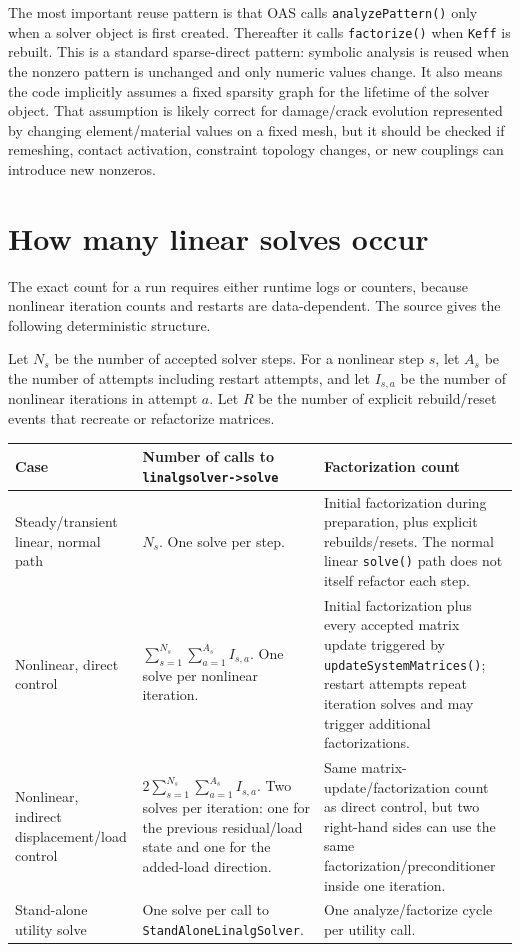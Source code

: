 \documentclass[10pt,a4paper]{article}
\newcommand{\code}[1]{\texttt{#1}}
\begin{document}
The most important reuse pattern is that OAS calls \code{analyzePattern()} only when a solver object is first created. Thereafter it calls \code{factorize()} when \code{Keff} is rebuilt. This is a standard sparse-direct pattern: symbolic analysis is reused when the nonzero pattern is unchanged and only numeric values change. It also means the code implicitly assumes a fixed sparsity graph for the lifetime of the solver object. That assumption is likely correct for damage/crack evolution represented by changing element/material values on a fixed mesh, but it should be checked if remeshing, contact activation, constraint topology changes, or new couplings can introduce new nonzeros.

\section{How many linear solves occur}

The exact count for a run requires either runtime logs or counters, because nonlinear iteration counts and restarts are data-dependent. The source gives the following deterministic structure.

Let \(N_s\) be the number of accepted solver steps. For a nonlinear step \(s\), let \(A_s\) be the number of attempts including restart attempts, and let \(I_{s,a}\) be the number of nonlinear iterations in attempt \(a\). Let \(R\) be the number of explicit rebuild/reset events that recreate or refactorize matrices.

\begin{table}[h]
\small
\centering
\begin{tabularx}{\textwidth}{L{0.25\textwidth} L{0.28\textwidth} Y}
\toprule
Case & Number of calls to \code{linalgsolver->solve} & Factorization count \\
\midrule
Steady/transient linear, normal path & \(N_s\). One solve per step. & Initial factorization during preparation, plus explicit rebuilds/resets. The normal linear \code{solve()} path does not itself refactor each step. \\
\addlinespace
Nonlinear, direct control & \(\displaystyle \sum_{s=1}^{N_s}\sum_{a=1}^{A_s} I_{s,a}\). One solve per nonlinear iteration. & Initial factorization plus every accepted matrix update triggered by \code{updateSystemMatrices()}; restart attempts repeat iteration solves and may trigger additional factorizations. \\
\addlinespace
Nonlinear, indirect displacement/load control & \(\displaystyle 2\sum_{s=1}^{N_s}\sum_{a=1}^{A_s} I_{s,a}\). Two solves per iteration: one for the previous residual/load state and one for the added-load direction. & Same matrix-update/factorization count as direct control, but two right-hand sides can use the same factorization/preconditioner inside one iteration. \\
\addlinespace
Stand-alone utility solve & One solve per call to \code{StandAloneLinalgSolver}. & One analyze/factorize cycle per utility call. \\
\bottomrule
\end{tabularx}
\end{table}
\end{document}
